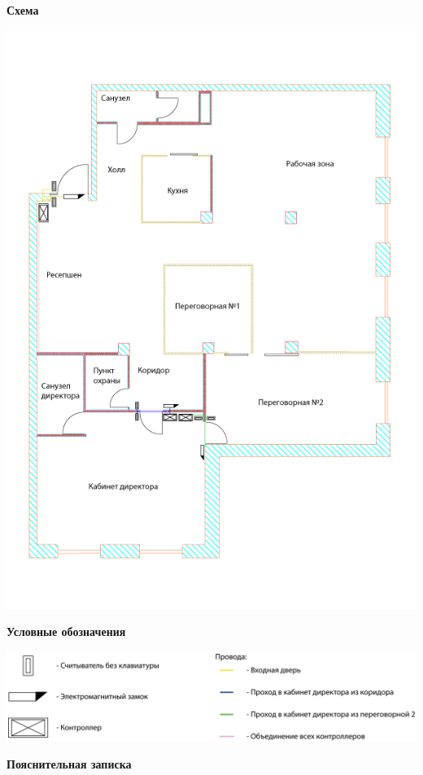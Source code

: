\documentclass[a4paper,14pt]{extarticle}
\begin{document}
    \begin{center}
        \textbf{Схема}
    \end{center}
    \vspace{-6ex}
    \begin{center}
        \includegraphics[scale=0.65]{pics/SCUD.png}
    \end{center}
    \textbf{Условные обозначения}
    \begin{center}
        \includegraphics[scale=0.65]{pics/SCUD(mark).png}
    \end{center}
    \textbf{Пояснительная записка}
\end{document}
